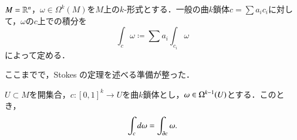 \begin{defi}
$M=\mathbb{R}^n$，$\omega \in \Omega^k(M)$を$M$上の$k$-形式とする．一般の曲$k$鎖体$c = \sum a_i c_i$に対して，$\omega$の$c$上での積分を
\begin{equation}
\int_c \omega \coloneqq \sum a_i \int_{c_i} \omega
\end{equation}によって定める．
\end{defi}

ここまでで，Stokes の定理を述べる準備が整った．

\begin{thm}[Stokes]

$U \subset M$を開集合，$c \colon [0,1]^k \to U$を曲$k$鎖体とし，$\omega \in \Omega^{k-1}(U)$とする．このとき，
\begin{equation}
\int_{c} \mathop{}\!d \omega = \int_{\partial c} \omega.
\end{equation}
\end{thm}

